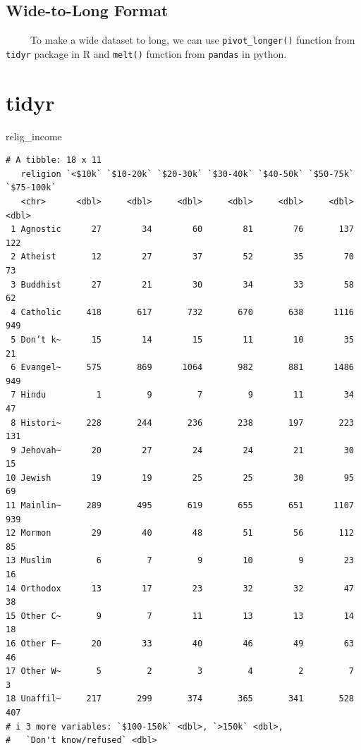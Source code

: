 \documentclass[
  letterpaper,
  DIV=11,
  numbers=noendperiod]{scrreprt}
\newenvironment{Shaded}{\begin{snugshade}}{\end{snugshade}}
\newcommand{\NormalTok}[1]{\textcolor[rgb]{0.00,0.23,0.31}{#1}}
\begin{document}
\subsection{Wide-to-Long Format}\label{wide-to-long-format}

~~~~~To make a wide dataset to long, we can use \texttt{pivot\_longer()}
function from \texttt{tidyr} package in R and \texttt{melt()} function
from \texttt{pandas} in python.

\section{tidyr}

\begin{Shaded}
\begin{Highlighting}[]
\NormalTok{relig\_income}
\end{Highlighting}
\end{Shaded}

\begin{verbatim}
# A tibble: 18 x 11
   religion `<$10k` `$10-20k` `$20-30k` `$30-40k` `$40-50k` `$50-75k` `$75-100k`
   <chr>      <dbl>     <dbl>     <dbl>     <dbl>     <dbl>     <dbl>      <dbl>
 1 Agnostic      27        34        60        81        76       137        122
 2 Atheist       12        27        37        52        35        70         73
 3 Buddhist      27        21        30        34        33        58         62
 4 Catholic     418       617       732       670       638      1116        949
 5 Don’t k~      15        14        15        11        10        35         21
 6 Evangel~     575       869      1064       982       881      1486        949
 7 Hindu          1         9         7         9        11        34         47
 8 Histori~     228       244       236       238       197       223        131
 9 Jehovah~      20        27        24        24        21        30         15
10 Jewish        19        19        25        25        30        95         69
11 Mainlin~     289       495       619       655       651      1107        939
12 Mormon        29        40        48        51        56       112         85
13 Muslim         6         7         9        10         9        23         16
14 Orthodox      13        17        23        32        32        47         38
15 Other C~       9         7        11        13        13        14         18
16 Other F~      20        33        40        46        49        63         46
17 Other W~       5         2         3         4         2         7          3
18 Unaffil~     217       299       374       365       341       528        407
# i 3 more variables: `$100-150k` <dbl>, `>150k` <dbl>,
#   `Don't know/refused` <dbl>
\end{verbatim}
\end{document}
